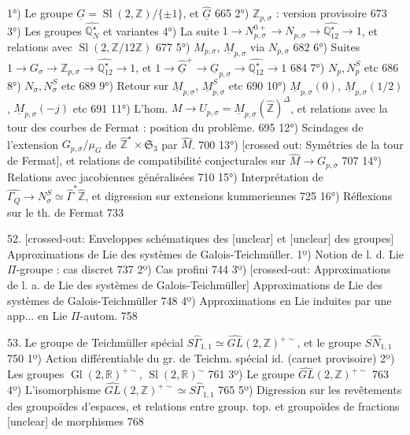 1°) Le groupe $\underline{G} = \operatorname{Sl}(2, \mathbb{Z})/\{\pm 1\}$, et $\hat{\underline{G}}$ 665
2°) $\mathbb{Z}_{p,\sigma}$ : version provisoire 673
3°) Les groupes $\widehat{\mathbb{Q}_N^{\star}}$ et variantes
4°) La suite $1 \to N_{p,\sigma}^{0+} \to N_{p,\sigma} \to \widehat{\mathbb{Q}_{12}^{\star}} \to 1$, et relations avec $\operatorname{Sl}(2, \mathbb{Z}/12\mathbb{Z})$ 677
5°) $M_{p,\sigma}$, $\underline{M}_{p,\sigma}$ via $N_{p,\sigma}$ 682
6°) Suites $1 \to G_{\sigma} \to \mathbb{Z}_{p,\sigma} \to \widehat{\mathbb{Q}_{12}^{\star}} \to 1$, et $1 \to \hat{\underline{G}}^+ \to \underline{G}_{p,\sigma} \to \widehat{\mathbb{Q}_{12}^{\star}} \to 1$ 684
7°) $N_p, N_p^S$ etc 686
8°) $N_{\sigma}, N_{\sigma}^S$ etc 689
9°) Retour sur $\underline{M}_{p,\sigma}$, $\underline{M}_{p,\sigma}^S$ etc 690
10°) $\underline{M}_{p,\sigma}(0)$, $\underline{M}_{p,\sigma}(1/2)$, $\underline{M}_{p,\sigma}(-j)$ etc 691
11°) L'hom. $M \to U_{p,\sigma} = \underline{M}_{p,\sigma}(\hat{\mathbb{Z}})^{\Delta}$, et relations avec la tour des courbes de Fermat : position du problème. 695
12°) Scindages de l'extension $G_{p,\sigma} / \mu_G$ de $\hat{\mathbb{Z}}^{\star} \times \mathfrak{S}_3$ par $\hat{M}$. 700
13°) [crossed out: Symétries de la tour de Fermat], et relations de compatibilité conjecturales sur $\hat{M} \to G_{p,\sigma}$ 707
14°) Relations avec jacobiennes généralisées 710
15°) Interprétation de $\widehat{\Gamma_Q} \to N_{\sigma}^S \simeq \hat{\Gamma}^* \hat{\mathbb{Z}}$, et digression sur extensions kummeriennes 725
16°) Réflexions sur le th. de Fermat 733

\newpage


52. [crossed-out: Enveloppes schématiques des [unclear] et [unclear] des groupes] Approximations de Lie des systèmes de Galois-Teichmüller.
1º) Notion de l. d. Lie $\Pi$-groupe : cas discret 737
2º) Cas profini 744
3º) [crossed-out: Approximations de l. a. de Lie des systèmes de Galois-Teichmüller] Approximations de Lie des systèmes de Galois-Teichmüller 748
4º) Approximations en Lie induites par une app... en Lie $\Pi$-autom. 758

53. Le groupe de Teichmüller spécial $S\hat{\Gamma}_{1,1} \simeq \widehat{GL}(2, \mathbb{Z})^{+\sim}$, et le groupe $S\hat{N}_{1,1}$ 750
1º) Action différentiable du gr. de Teichm. spécial id. (carnet provisoire)
2º) Les groupes $\operatorname{Gl}(2, \mathbb{R})^{+\sim}$, $\operatorname{Sl}(2, \mathbb{R})^\sim$ 761
3º) Le groupe $\widehat{GL}(2, \mathbb{Z})^{+\sim}$ 763
4º) L'isomorphisme $\widehat{GL}(2, \mathbb{Z})^{+\sim} \simeq S\hat{\Gamma}_{1,1}$ 765
5º) Digression sur les revêtements des groupoïdes d'espaces, et relations entre group. top. et groupoïdes de fractions [unclear] de morphismes 768

